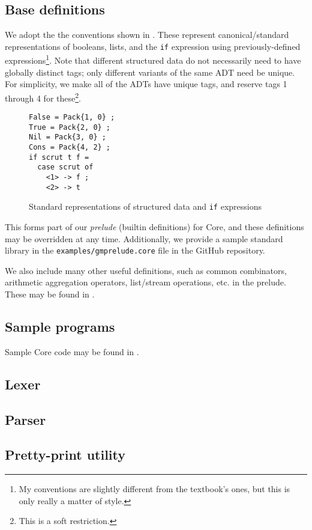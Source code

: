 \subsection{Base definitions}
\label{sec:core-base}

We adopt the the conventions shown in . These represent canonical/standard representations of booleans, lists, and the \texttt{if} expression using previously-defined expressions\footnote{My conventions are slightly different from the textbook's ones, but this is only really a matter of style.}. Note that different structured data do not necessarily need to have globally distinct tags; only different variants of the same ADT need be unique. For simplicity, we make all of the ADTs have unique tags, and reserve tags 1 through 4 for these\footnote{This is a soft restriction.}.

\begin{figure}
  \centering
  \begin{verbatim}
False = Pack{1, 0} ;
True = Pack{2, 0} ;
Nil = Pack{3, 0} ;
Cons = Pack{4, 2} ;
if scrut t f =
  case scrut of
    <1> -> f ;
    <2> -> t
  \end{verbatim}
  \caption{Standard representations of structured data and \texttt{if} expressions}
  \label{fig:standard-representations}
\end{figure}

This forms part of our \textit{prelude} (builtin definitions) for Core, and these definitions may be overridden at any time. Additionally, we provide a sample standard library in the \texttt{examples/gmprelude.core} file in the GitHub repository.

We also include many other useful definitions, such as common combinators, arithmetic aggregation operators, list/stream operations, etc. in the prelude. These may be found in .

\subsection{Sample programs}
\label{sec:sample-programs}

Sample Core code may be found in .

\subsection{Lexer}
\label{sec:lexer}


\subsection{Parser}
\label{sec:parser}


\subsection{Pretty-print utility}
\label{sec:pretty-print}

